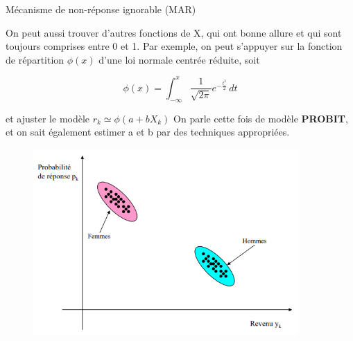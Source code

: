 \begin{frame}{Mécanisme de non-réponse ignorable (MAR)}
	
On peut aussi trouver d'autres fonctions de X, qui ont bonne allure et qui
sont toujours comprises entre 0 et 1. Par exemple, on peut s'appuyer sur la fonction de
répartition $\phi(x)$ d'une loi normale centrée réduite, soit


\[ \phi(x) = 
\int_{-\infty}^{x} \frac{1}{\sqrt{2\pi}} e^{-\frac{t^2}{2}} \, dt
\]


et ajuster le modèle $r_k \simeq \phi(a	+ bX_k)$
On parle cette fois de modèle \textbf{PROBIT}, et on sait
également estimer a et b par des techniques appropriées.

\end{frame}

\begin{frame}{}
	\begin{figure}[h]
		\centering
		\includegraphics[width=0.9\textwidth]{img/re.png}
	\end{figure}
\end{frame}

